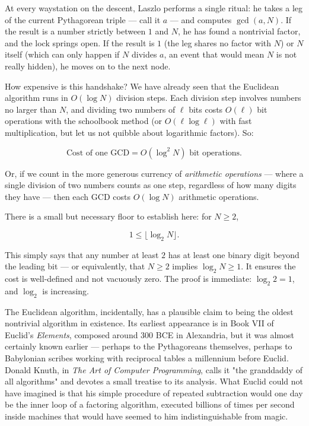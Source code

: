 \documentclass[11pt,openany]{book}
\theoremstyle{definition}
\theoremstyle{plain}
\theoremstyle{remark}
\begin{document}
At every waystation on the descent, Laszlo performs a single ritual: he takes a leg of the current Pythagorean triple — call it $a$ — and computes $\gcd(a, N)$. If the result is a number strictly between $1$ and $N$, he has found a nontrivial factor, and the lock springs open. If the result is $1$ (the leg shares no factor with $N$) or $N$ itself (which can only happen if $N$ divides $a$, an event that would mean $N$ is not really hidden), he moves on to the next node.

How expensive is this handshake? We have already seen that the Euclidean algorithm runs in $O(\log N)$ division steps. Each division step involves numbers no larger than $N$, and dividing two numbers of $\ell$ bits costs $O(\ell)$ bit operations with the schoolbook method (or $O(\ell \log \ell)$ with fast multiplication, but let us not quibble about logarithmic factors). So:

$$\text{Cost of one GCD} = O(\log^2 N) \text{ bit operations.}$$

Or, if we count in the more generous currency of \textit{arithmetic operations} — where a single division of two numbers counts as one step, regardless of how many digits they have — then each GCD costs $O(\log N)$ arithmetic operations.

There is a small but necessary floor to establish here: for $N \ge 2$,

$$1 \le \lfloor \log_2 N \rfloor.$$

This simply says that any number at least $2$ has at least one binary digit beyond the leading bit — or equivalently, that $N \ge 2$ implies $\log_2 N \ge 1$. It ensures the cost is well-defined and not vacuously zero. The proof is immediate: $\log_2 2 = 1$, and $\log_2$ is increasing.

The Euclidean algorithm, incidentally, has a plausible claim to being the oldest nontrivial algorithm in existence. Its earliest appearance is in Book VII of Euclid's \textit{Elements}, composed around 300 BCE in Alexandria, but it was almost certainly known earlier — perhaps to the Pythagoreans themselves, perhaps to Babylonian scribes working with reciprocal tables a millennium before Euclid. Donald Knuth, in \textit{The Art of Computer Programming}, calls it "the granddaddy of all algorithms" and devotes a small treatise to its analysis. What Euclid could not have imagined is that his simple procedure of repeated subtraction would one day be the inner loop of a factoring algorithm, executed billions of times per second inside machines that would have seemed to him indistinguishable from magic.
\end{document}

